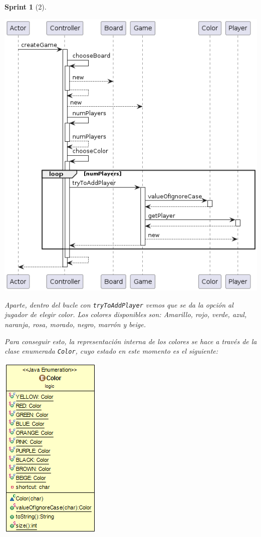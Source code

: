 \documentclass{article}
\theoremstyle{break}
\newtheorem*{sprint}{Sprint}
\begin{document}
\begin{sprint}[2]
\begin{center}
\includegraphics[scale=0.5]{Controller.createGame()-sprint2.png} 
\end{center}

Aparte, dentro del bucle con \texttt{tryToAddPlayer} vemos que se da la opción al jugador de elegir color. Los colores disponibles son: Amarillo, rojo, verde, azul, naranja, rosa, morado, negro, marrón y beige.

Para conseguir esto, la representación interna de los colores se hace a través de la clase enumerada \texttt{Color}, cuyo estado en este momento es el siguiente:

\begin{center}
\includegraphics[scale=0.9]{Color-sprint2.png} 
\end{center}

\end{sprint}
\end{document}
